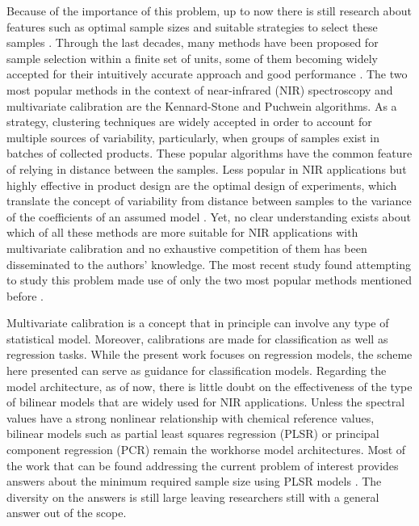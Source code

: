 \documentclass[journal=ancham,manuscript=article]{achemso}
\begin{document}
Because of the importance of this problem, up to now there is still research about features such as optimal sample sizes and suitable strategies to select these samples \cite{Au2020, Liu2019}. Through the last decades, many methods have been proposed for sample selection within a finite set of units, some of them becoming widely accepted for their intuitively accurate approach and good performance \cite{Shetty2012a, Nawar2018, He2015}. The two most popular methods in the context of near-infrared (NIR) spectroscopy and multivariate calibration are the Kennard-Stone\cite{Kennard1969} and  Puchwein\cite{Puchwein1988} algorithms. As a strategy, clustering techniques are widely accepted in order to account for multiple sources of variability\cite{Naes1990}, particularly, when groups of samples exist in batches of collected products\cite{Bobelyn2010}. These popular algorithms have the common feature of relying in distance between the samples. Less popular in NIR applications but highly effective in product design are the optimal design of experiments, which translate the concept of variability from distance between samples to the variance of the coefficients of an assumed model \cite{Goos2011}. Yet, no clear understanding exists about which of all these methods are more suitable for NIR applications with multivariate calibration and no exhaustive competition of them has been disseminated to the authors' knowledge. The most recent study found attempting to study this problem made use of only the two most popular methods mentioned before \cite{Au2020}.

Multivariate calibration is a concept that in principle can involve any type of statistical model. Moreover, calibrations are made for classification as well as regression tasks. While the present work focuses on regression models, the scheme here presented can serve as guidance for classification models. Regarding the model architecture, as of now, there is little doubt on the effectiveness of the type of bilinear models that are widely used for NIR applications. Unless the spectral values have a strong nonlinear relationship with chemical reference values, bilinear models such as partial least squares regression (PLSR) or principal component regression (PCR) remain the workhorse model architectures. Most of the work that can be found addressing the current problem of interest provides answers about the minimum required sample size using PLSR models \cite{Naes1990, Au2020, Shetty2012a, Rodionova2008}. The diversity on the answers is still large leaving researchers still with a general answer out of the scope. 
\end{document}

